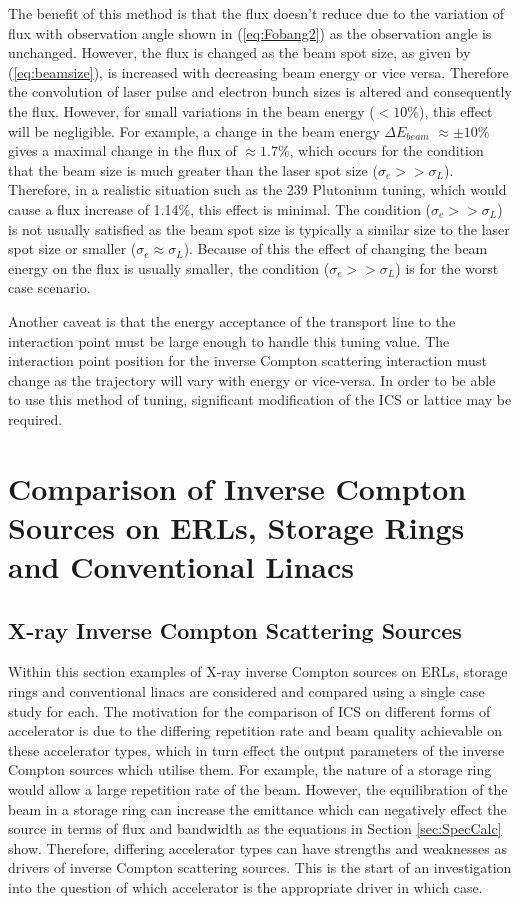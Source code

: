 \documentclass[11pt]{article}
\begin{document}
The benefit of this method is that the flux doesn't reduce due to the variation of flux with observation angle shown in (\ref{eq:Fobang2}) as the observation angle is unchanged. However, the flux is changed as the beam spot size, as given by (\ref{eq:beamsize}), is increased with decreasing beam energy or vice versa. Therefore the convolution of laser pulse and electron bunch sizes is altered and consequently the flux. However, for small variations in the beam energy ($<10\%$), this effect will be negligible. For example, a change in the beam energy $\Delta E_{beam}$ $\approx \pm 10\%$ gives a maximal change in the flux of $\approx 1.7\%$, which occurs for the condition that the beam size is much greater than the laser spot size ($\sigma_{e} >> \sigma_{L}$).  Therefore, in a realistic situation such as the 239 Plutonium tuning, which would cause a flux increase of 1.14\%, this effect is minimal. The condition ($\sigma_{e} >> \sigma_{L}$) is not usually satisfied as the beam spot size is typically a similar size to the laser spot size or smaller ($\sigma_{e} \approx \sigma_{L}$). Because of this the effect of changing the beam energy on the flux is usually smaller, the  condition ($\sigma_{e} >> \sigma_{L}$) is for the worst case scenario. 

Another caveat is that the energy acceptance of the transport line to the interaction point must be large enough to handle this tuning value. The interaction point position for the inverse Compton scattering interaction must change as the trajectory will vary with energy or vice-versa. In order to be able to use this method of tuning, significant modification of the ICS or lattice may be required.
    

  
\section{Comparison of Inverse Compton Sources on ERLs, Storage Rings and Conventional Linacs}
\subsection{X-ray Inverse Compton Scattering Sources}
\label{sec:xrayicscomp}

Within this section examples of X-ray inverse Compton sources on ERLs, storage rings and conventional linacs are considered and compared using a single case study for each. The motivation for the comparison of ICS on different forms of accelerator is due to the differing repetition rate and beam quality achievable on these accelerator types, which in turn effect the output parameters of the inverse Compton sources which utilise them. For example, the nature of a storage ring would allow a large repetition rate of the beam. However, the equilibration of the beam in a storage ring can increase the emittance which can negatively effect the source in terms of flux and bandwidth as the equations in Section \ref{sec:SpecCalc} show. Therefore, differing accelerator types can have strengths and weaknesses as drivers of inverse Compton scattering sources. This is the start of an investigation into the question of which accelerator is the appropriate driver in which case.   
\end{document}
